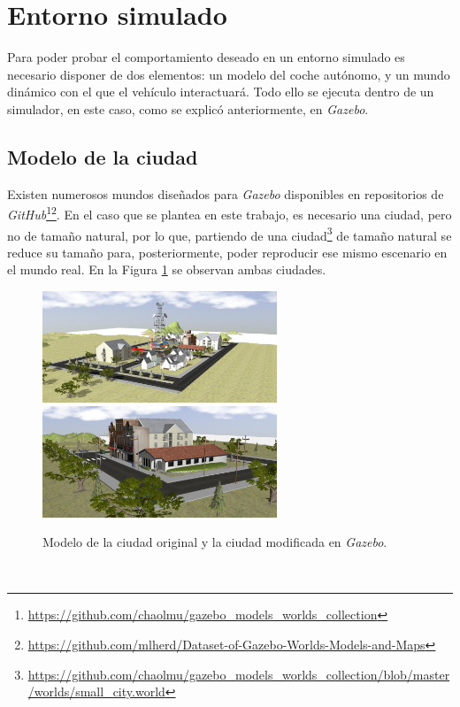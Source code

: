 \section{Entorno simulado}
\label{section:simulation}
Para poder probar el comportamiento deseado en un entorno simulado es necesario disponer de dos elementos: un modelo del coche autónomo, y un mundo dinámico con el que el vehículo interactuará. Todo ello se ejecuta dentro de un simulador, en este caso, como se explicó anteriormente, en \textit{Gazebo}.\\

\subsection{Modelo de la ciudad}
\label{subsection:citymodel}
Existen numerosos mundos diseñados para \textit{Gazebo} disponibles en repositorios de \textit{GitHub}\footnote{\url{https://github.com/chaolmu/gazebo_models_worlds_collection}}\footnote{\url{https://github.com/mlherd/Dataset-of-Gazebo-Worlds-Models-and-Maps}}. En el caso que se plantea en este trabajo, es necesario una ciudad, pero no de tamaño natural, por lo que, partiendo de una ciudad\footnote{\url{https://github.com/chaolmu/gazebo_models_worlds_collection/blob/master/worlds/small_city.world}} de tamaño natural se reduce su tamaño para, posteriormente, poder reproducir ese mismo escenario en el mundo real. En la Figura \ref{fig:cityversus} se observan ambas ciudades.\\

\begin{figure} [h!]
	\begin{center}
		\includegraphics[width=7cm]{figs/city2}\hspace{1cm}\includegraphics[width=7cm]{figs/smallcity}
	\end{center}
	\caption{Modelo de la ciudad original y la ciudad modificada en \textit{Gazebo}.}
	\label{fig:cityversus}
\end{figure}\

